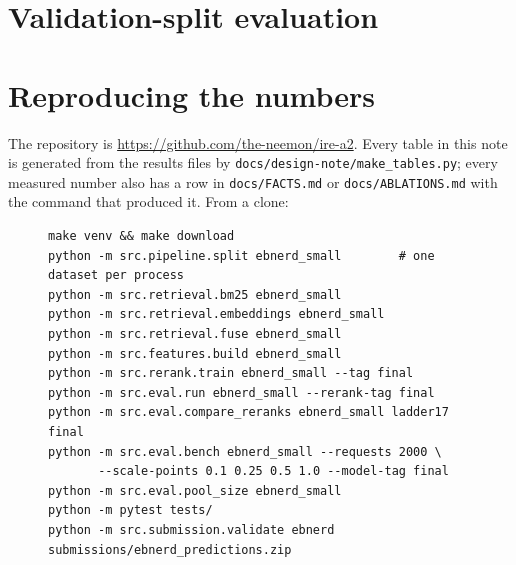 \begin{table}[t]
\centering\small


\medskip

\caption{Top left: the click-popularity window. Top right: dropping history clicks with low scroll
depth (\eb{}, 100 clicks). Middle: the recency half-life, flat to four decimals over a 168$\times$
range. Bottom: history length and read-time weighting of the user vector on clean history.}
\end{table}

\section{Validation-split evaluation}
\label{app:val}

\begin{table}[t]
\centering\scriptsize

\caption{All accuracy metrics on val with 95\% intervals.}
\end{table}

\section{Reproducing the numbers}
\label{app:repro}

The repository is \url{https://github.com/the-neemon/ire-a2}. Every table in this note is
generated from the results files by \texttt{docs/design-note/make\_tables.py}; every measured
number also has a row in \texttt{docs/FACTS.md} or \texttt{docs/ABLATIONS.md} with the command
that produced it. From a clone:

\begin{figure}[t]
\begin{small}
\begin{verbatim}
make venv && make download
python -m src.pipeline.split ebnerd_small        # one dataset per process
python -m src.retrieval.bm25 ebnerd_small
python -m src.retrieval.embeddings ebnerd_small
python -m src.retrieval.fuse ebnerd_small
python -m src.features.build ebnerd_small
python -m src.rerank.train ebnerd_small --tag final
python -m src.eval.run ebnerd_small --rerank-tag final
python -m src.eval.compare_reranks ebnerd_small ladder17 final
python -m src.eval.bench ebnerd_small --requests 2000 \
       --scale-points 0.1 0.25 0.5 1.0 --model-tag final
python -m src.eval.pool_size ebnerd_small
python -m pytest tests/
python -m src.submission.validate ebnerd submissions/ebnerd_predictions.zip
\end{verbatim}
\end{small}
\end{figure}

